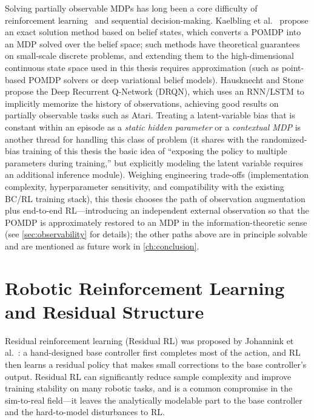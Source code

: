 Solving partially observable MDPs has long been a core difficulty of reinforcement learning~\cite{sutton2018reinforcement} and sequential decision-making. Kaelbling et al.~\cite{kaelbling1998planning} propose an exact solution method based on belief states, which converts a POMDP into an MDP solved over the belief space; such methods have theoretical guarantees on small-scale discrete problems, and extending them to the high-dimensional continuous state space used in this thesis requires approximation (such as point-based POMDP solvers or deep variational belief models). Hausknecht and Stone~\cite{hausknecht2015deep} propose the Deep Recurrent Q-Network (DRQN), which uses an RNN/LSTM to implicitly memorize the history of observations, achieving good results on partially observable tasks such as Atari. Treating a latent-variable bias that is constant within an episode as a \emph{static hidden parameter} or a \emph{contextual MDP} is another thread for handling this class of problem (it shares with the randomized-bias training of this thesis the basic idea of ``exposing the policy to multiple parameters during training,'' but explicitly modeling the latent variable requires an additional inference module). Weighing engineering trade-offs (implementation complexity, hyperparameter sensitivity, and compatibility with the existing BC/RL training stack), this thesis chooses the path of observation augmentation plus end-to-end RL---introducing an independent external observation so that the POMDP is approximately restored to an MDP in the information-theoretic sense (see \cref{sec:observability} for details); the other paths above are in principle solvable and are mentioned as future work in \cref{ch:conclusion}.

\section{Robotic Reinforcement Learning and Residual Structure}\label{sec:residual_rl}

Residual reinforcement learning (Residual RL) was proposed by Johannink et al.~\cite{johannink2019residual}: a hand-designed base controller first completes most of the action, and RL then learns a residual policy that makes small corrections to the base controller's output. Residual RL can significantly reduce sample complexity and improve training stability on many robotic tasks, and is a common compromise in the sim-to-real field---it leaves the analytically modelable part to the base controller and the hard-to-model disturbances to RL.

